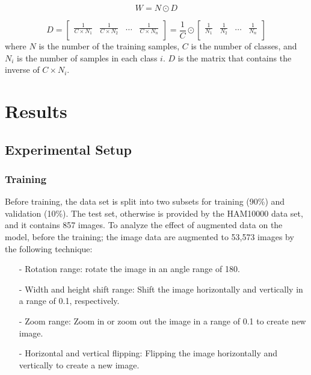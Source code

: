 \documentclass[sensors,article,accept,pdftex,moreauthors]{Definitions/mdpi}
\begin{document}
	\begin{equation}
		\label{eqn:weightformula}
		W = N \odot D
	\end{equation}
	
	\begin{equation}
		\label{eqn:vector-inverse-percent}
		D = \begin{bmatrix}
\frac{1}{C \times  N_1} & \frac{1}{C \times  N_2} & \dots & \frac{1}{C \times  N_n}\\
		\end{bmatrix} = \frac{1}{C} \odot \begin{bmatrix}
\frac{1}{N_1} & \frac{1}{N_2} & \dots & \frac{1}{N_n}\\
		\end{bmatrix}
	\end{equation}
where $N$ is the number of the training samples, $C$ is the number of classes, and $N_i$ is the number of samples in each class $i$. $D$ is the matrix that contains the inverse of $C \times N_i$. 
	
	\section{Results}
	\subsection{Experimental Setup}
	\subsubsection{Training}
	Before training, the data set is split into two subsets for training (90\%) and validation (10\%). The test set, otherwise is  provided by the HAM10000 data set, and it contains 857 images. To analyze the effect of augmented data on the model, before the training; the image data are augmented to 53,573 images by the following technique:
	
	\begin{itemize}
	\item[-] Rotation range: rotate the image in an {angle range of 180}. 
	\item[-] Width and height shift range: Shift the image horizontally and vertically {in a range of 0.1}, respectively. 
	\item[-] Zoom range:  Zoom in or zoom out the image {in a range of 0.1} to create new image. 
	\item[-] Horizontal and vertical flipping: Flipping the image horizontally and vertically to create a new image.
	\end{itemize}
	
\end{document}
